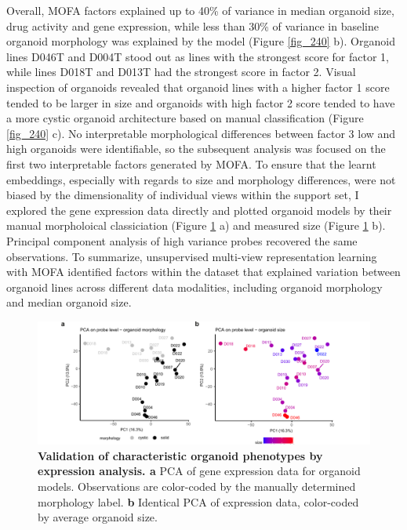 \begin{flushleft}
\bigbreak
Overall, MOFA factors explained up to 40\% of variance in median organoid size, drug activity and gene expression, while less than 30\% of variance in baseline organoid morphology was explained by the model (Figure \ref{fig_240} b). Organoid lines D046T and D004T stood out as lines with the strongest score for factor 1, while lines D018T and D013T had the strongest score in factor 2. Visual inspection of organoids revealed that organoid lines with a higher factor 1 score tended to be larger in size and organoids with high factor 2 score tended to have a more cystic organoid architecture based on manual classification (Figure \ref{fig_240} c). No interpretable morphological differences between factor 3 low and high organoids were identifiable, so the subsequent analysis was focused on the first two interpretable factors generated by MOFA. To ensure that the learnt embeddings, especially with regards to size and morphology differences, were not biased by the dimensionality of individual views within the support set, I explored the gene expression data directly and plotted organoid models by their manual morpholoical classiciation (Figure \ref{fig_241} a) and measured size (Figure \ref{fig_241} b). Principal component analysis of high variance probes recovered the same observations. To summarize, unsupervised multi-view representation learning with MOFA identified factors within the dataset that explained variation between organoid lines across different data modalities, including organoid morphology and median organoid size. 

\begin{figure}[h!]
\centering
\includegraphics[width=\textwidth,
                height=\textheight,
                keepaspectratio]{figures/promise/pdf/fig_4_1.pdf}
\caption[Validation of characteristic organoid phenotypes by expression analysis]{\textbf{Validation of characteristic organoid phenotypes by expression analysis. a} PCA of gene expression data for organoid models. Observations are color-coded by the manually determined morphology label. \textbf{b} Identical PCA of expression data, color-coded by average organoid size.}
\label{fig_241}
\end{figure}



\end{flushleft}
